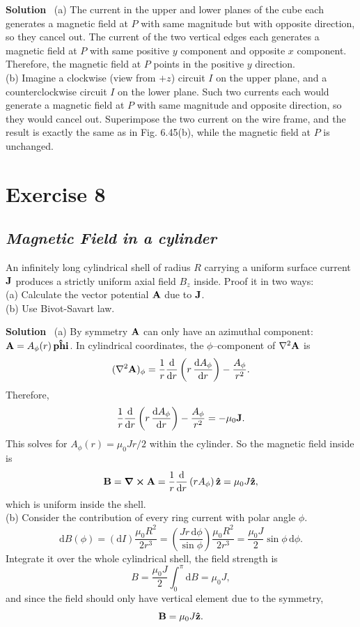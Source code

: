 \documentclass[hidelinks]{article}
\begin{document}
\vspace{5mm}
\noindent
\textbf{Solution} \, (a) The current in the upper and lower planes of the cube each generates a magnetic field at $P$ with same magnitude but with opposite direction, so they cancel out. The current of the two vertical edges each generates a magnetic field at $P$ with same positive $y$ component and opposite $x$ component. Therefore, the magnetic field at $P$ points in the positive $y$ direction.\\[3mm]
(b) Imagine a clockwise (view from $+z$) circuit $I$ on the upper plane, and a counterclockwise circuit $I$ on the lower plane. Such two currents each would generate a magnetic field at $P$ with same magnitude and opposite direction, so they would cancel out. Superimpose the two current on the wire frame, and the result is exactly the same as in Fig. 6.45(b), while the magnetic field at $P$ is unchanged.

\pagebreak

\section{Exercise 8}
\subsection{\textit{Magnetic Field in a cylinder}}
An infinitely long cylindrical shell of radius $R$ carrying a uniform surface current $\vb{J}$ produces a strictly uniform axial field $B_z$ inside. Proof it in two ways:\\[3mm]
(a) Calculate the vector potential $\vb{A}$ due to $\vb{J}$.\\
(b) Use Bivot-Savart law.

\vspace{5mm}
\noindent
\textbf{Solution} \, (a) By symmetry $\vb{A}$ can only have an azimuthal component: $\vb{A} = A_\phi(r)\,\vu{phi}$. In cylindrical coordinates, the $\phi$–component of $\laplacian{\vb{A}}$ is
$$(\laplacian{\vb{A}})_{\phi} = \frac{1}{r}\frac{\mathrm{d}}{\mathrm{d}r}\left(r\,\frac{\mathrm{d}A_\phi}{\mathrm{d}r}\right) - \frac{A_\phi}{r^2}.$$
Therefore,
$$\frac{1}{r}\frac{\mathrm{d}}{\mathrm{d}r}\left(r\,\frac{\mathrm{d}A_\phi}{\mathrm{d}r}\right) - \frac{A_\phi}{r^2} = -\mu_0 \vb{J}.$$
This solves for $A_{\phi}(r) = \mu_0 Jr/2 $ within the cylinder. So the magnetic field inside is
$$\vb{B} = \curl{\vb{A}} = \frac{1}{r} \frac{\mathrm{d}}{\mathrm{d}r}\left(rA_\phi\right)\vu{z} = \mu_0J\vu{z},$$
which is uniform inside the shell. \\[3mm]
(b) Consider the contribution of every ring current with polar angle $\phi$.
$$\mathrm{d}B(\phi)= (\mathrm{d}I)\frac{\mu_0 R^2}{2r^3} = \left(\frac{Jr\,\mathrm{d}\phi}{\sin \phi} \right)\frac{\mu_0 R^2}{2r^3}=  \frac{\mu_0 J}{2} \sin \phi \, \mathrm{d}\phi.$$
Integrate it over the whole cylindrical shell, the field strength is
$$B = \frac{\mu_0J}{2} \int_0^\pi \mathrm{d}B = \mu_0 J,$$
and since the field should only have vertical element due to the symmetry,
$$\vb{B} = \mu_0J \vu{z}.$$
\end{document}
